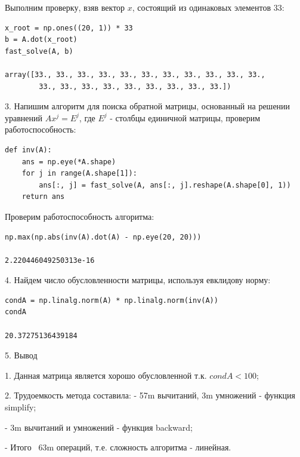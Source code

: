 Выполним проверку, взяв вектор $x$, состоящий из одинаковых элементов $33$:
\begin{verbatim}
x_root = np.ones((20, 1)) * 33
b = A.dot(x_root)
fast_solve(A, b)

array([33., 33., 33., 33., 33., 33., 33., 33., 33., 33., 33.,
        33., 33., 33., 33., 33., 33., 33., 33., 33.])
\end{verbatim}

3. Напишим алгоритм для поиска обратной матрицы, основанный на решении уравнений $Ax^j=E^j$, где $E^j$ - столбцы единичной матрицы, проверим работоспособность:
\begin{verbatim}
def inv(A):
    ans = np.eye(*A.shape)
    for j in range(A.shape[1]):
        ans[:, j] = fast_solve(A, ans[:, j].reshape(A.shape[0], 1))
    return ans
\end{verbatim}

Проверим работоспособность алгоритма:

\begin{verbatim}
np.max(np.abs(inv(A).dot(A) - np.eye(20, 20)))

2.220446049250313e-16
\end{verbatim}


4. Найдем число обусловленности матрицы, используя евклидову норму:
\begin{verbatim}
condA = np.linalg.norm(A) * np.linalg.norm(inv(A))
condA

20.37275136439184
\end{verbatim}

5. Вывод

1. Данная матрица является хорошо обусловленной т.к. $cond A < 100$;

2. Трудоемкость метода составила:
   - 57m вычитаний, 3m умножений - функция simplify;

   - 3m вычитаний и умножений - функция backward;

   - Итого ~63m операций, т.е. сложность алгоритма - линейная.

